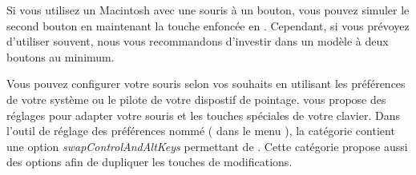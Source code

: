 \documentclass[a4paper,10pt,twoside]{book}
\begin{document}



Si vous utilisez un Macintosh avec une souris à un bouton, vous pouvez
simuler le second bouton en maintenant la touche \clover{} enfoncée 
en \clickant. Cependant, si vous prévoyez d'utiliser \pharo souvent, nous
vous recommandons d'investir dans un modèle à deux boutons au minimum.

Vous pouvez configurer votre souris selon vos souhaits en utilisant
les préférences de votre système ou le pilote de votre dispostif de
pointage.
\pharo vous propose des réglages pour adapter votre souris et les
touches spéciales de votre clavier. 
Dans l'outil de réglage des préférences nommé  ( dans le menu ), la catégorie
 contient une option \emph{swapControlAndAltKeys}
permettant de .
Cette catégorie
propose aussi des options afin de dupliquer les touches de modifications.%
\end{document}
